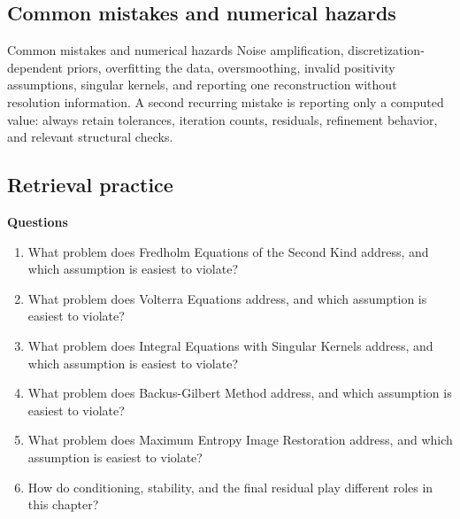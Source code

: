 \documentclass[10pt,letterpaper]{article}
\begin{document}
\subsection*{Common mistakes and numerical hazards}
\begin{warnbox}{Common mistakes and numerical hazards}
Noise amplification, discretization-dependent priors, overfitting the data, oversmoothing, invalid positivity assumptions, singular kernels, and reporting one reconstruction without resolution information.  A second recurring mistake is reporting only a computed value: always retain tolerances, iteration counts, residuals, refinement behavior, and relevant structural checks.
\end{warnbox}

\subsection*{Retrieval practice}
\textbf{Questions}
\begin{enumerate}
\item What problem does Fredholm Equations of the Second Kind address, and which assumption is easiest to violate?
\item What problem does Volterra Equations address, and which assumption is easiest to violate?
\item What problem does Integral Equations with Singular Kernels address, and which assumption is easiest to violate?
\item What problem does Backus-Gilbert Method address, and which assumption is easiest to violate?
\item What problem does Maximum Entropy Image Restoration address, and which assumption is easiest to violate?
\item How do conditioning, stability, and the final residual play different roles in this chapter?
\end{enumerate}
\end{document}
